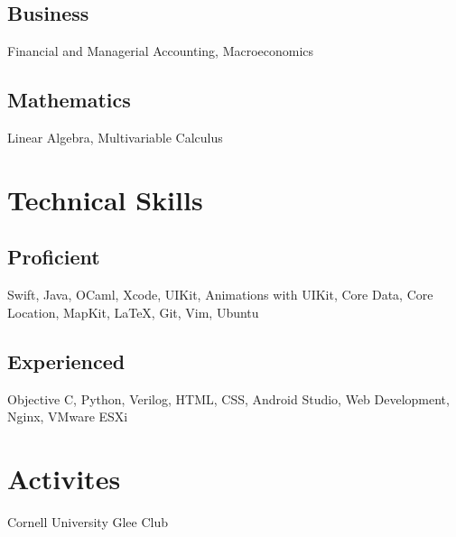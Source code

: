 \documentclass[]{deedy-resume-openfont}
\let\sectionold\section
\renewcommand{\section}[1]{
	\sectionold{\textcolor{sectiontitlecolor}{#1}}
}
\begin{document}
\begin{minipage}[t]{0.33\textwidth}
\subsection{Business}
Financial and Managerial Accounting, Macroeconomics
\sectionsep

\subsection{Mathematics}
Linear Algebra, Multivariable Calculus

\sectionsep


\section{Technical Skills}
\subsection{Proficient}
Swift, Java, OCaml, Xcode, UIKit, Animations with UIKit, Core Data, Core Location, MapKit, \LaTeX{}, Git, Vim, Ubuntu
\sectionsep
\subsection{Experienced}
Objective C, Python, Verilog, HTML, CSS, Android Studio, Web Development, Nginx, VMware ESXi
\sectionsep

\section{Activites}
Cornell University Glee Club


%
%

\end{minipage} 
\hfill
\end{document}
